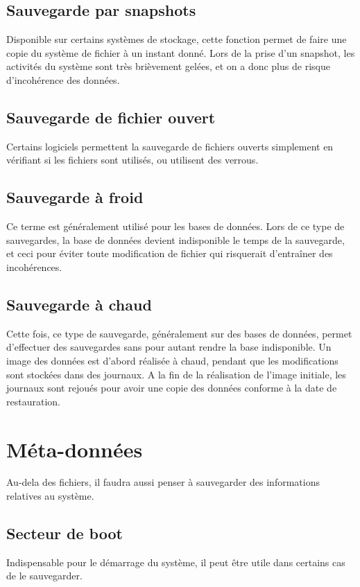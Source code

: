 \documentclass[a4paper,11pt]{report}
\begin{document}
\subsection{Sauvegarde par snapshots}
Disponible sur certains systèmes de stockage, cette fonction permet de faire une copie du système de fichier à un instant donné.
Lors de la prise d'un snapshot, les activités du système sont très brièvement gelées, et on a donc plus de risque d'incohérence des données.

\subsection{Sauvegarde de fichier ouvert}
Certains logiciels permettent la sauvegarde de fichiers ouverts simplement en vérifiant si les fichiers sont utilisés, ou utilisent des verrous.

\subsection{Sauvegarde à froid}
Ce terme est généralement utilisé pour les bases de données.
Lors de ce type de sauvegardes, la base de données devient indisponible le temps de la sauvegarde, et ceci pour éviter toute modification de fichier qui risquerait d'entraîner des incohérences.

\subsection{Sauvegarde à chaud}
Cette fois, ce type de sauvegarde, généralement sur des bases de données, permet d'effectuer des sauvegardes sans pour autant rendre la base indisponible.
Un image des données est d'abord réalisée à chaud, pendant que les modifications sont stockées dans des journaux.
A la fin de la réalisation de l'image initiale, les journaux sont rejoués pour avoir une copie des données conforme à la date de restauration.

\section{Méta-données}
Au-dela des fichiers, il faudra aussi penser à sauvegarder des informations relatives au système.

\subsection{Secteur de boot}
Indispensable pour le démarrage du système, il peut être utile dans certains cas de le sauvegarder.
\end{document}
